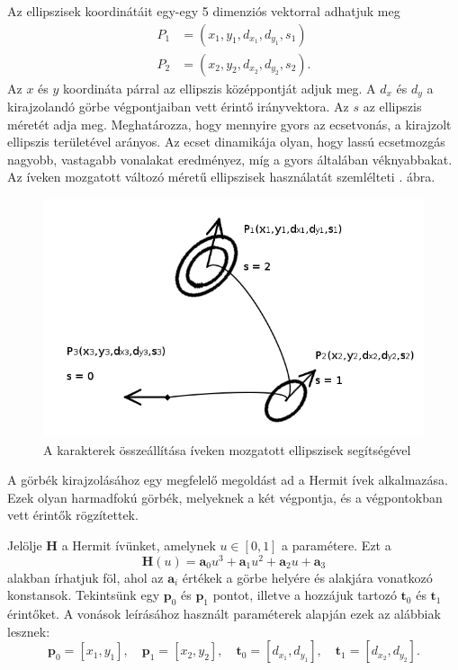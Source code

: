 \begin{enumerate}
Az ellipszisek koordinátáit egy-egy 5 dimenziós vektorral adhatjuk meg
\begin{align*}
P_1 &= (x_1, y_1, d_{x_1}, d_{y_1}, s_1) \\
P_2 &= (x_2, y_2, d_{x_2}, d_{y_2}, s_2).
\end{align*}
Az $x$ és $y$ koordináta párral az ellipszis középpontját adjuk meg. A $d_x$ és $d_y$ a kirajzolandó görbe végpontjaiban vett érintő irányvektora. Az $s$ az ellipszis méretét adja meg. Meghatározza, hogy mennyire gyors az ecsetvonás, a kirajzolt ellipszis területével arányos. Az ecset dinamikája olyan, hogy lassú ecsetmozgás nagyobb, vastagabb vonalakat eredményez, míg a gyors általában véknyabbakat. Az íveken mozgatott változó méretű ellipszisek használatát szemlélteti . ábra.

\begin{figure}
\centering
\includegraphics[scale=0.5]{images/proc_draw2}
\caption{A karakterek összeállítása íveken mozgatott ellipszisek segítségével}
\label{fig:proc_draw2}
\end{figure}

A görbék kirajzolásához egy megfelelő megoldást ad a Hermit ívek alkalmazása. Ezek olyan harmadfokú görbék, melyeknek a két végpontja, és a végpontokban vett érintők rögzítettek.

Jelölje $\textbf{H}$ a Hermit ívünket, amelynek $u \in [0, 1]$ a paramétere. Ezt a
$$
\textbf{H}(u) = \textbf{a}_0 u^3 + \textbf{a}_1 u^2 + \textbf{a}_2 u + \textbf{a}_3
$$
alakban írhatjuk föl, ahol az $\textbf{a}_i$ értékek a görbe helyére és alakjára vonatkozó konstansok. Tekintsünk egy $\textbf{p}_0$ és $\textbf{p}_1$ pontot, illetve a hozzájuk tartozó $\textbf{t}_0$ és $\textbf{t}_1$ érintőket. A vonások leírásához használt paraméterek alapján ezek az alábbiak lesznek:
$$
\textbf{p}_0 = [x_1, y_1], \quad
\textbf{p}_1 = [x_2, y_2], \quad
\textbf{t}_0 = [d_{x_1}, d_{y_1}], \quad
\textbf{t}_1 = [d_{x_2}, d_{y_2}].
$$


\end{enumerate}
